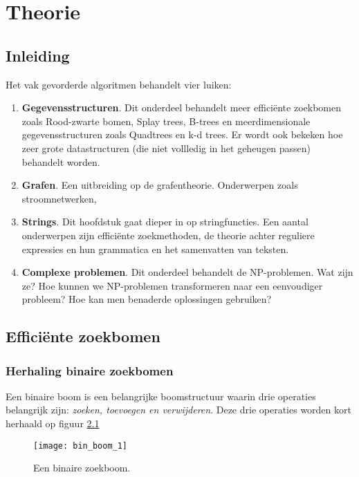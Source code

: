 \documentclass{report}
\begin{document}
	\tableofcontents
	\part{Theorie}
	\chapter{Inleiding}
	Het vak gevorderde algoritmen behandelt vier luiken:
	\begin{enumerate}
		\item \textbf{Gegevensstructuren}. Dit onderdeel behandelt meer efficiënte zoekbomen zoals Rood-zwarte bomen, Splay trees, B-trees en meerdimensionale gegevensstructuren zoals Quadtrees en k-d trees. Er wordt ook bekeken hoe zeer grote datastructuren (die niet vollledig in het geheugen passen) behandelt worden.
		
		\item \textbf{Grafen}. Een uitbreiding op de grafentheorie. Onderwerpen zoals stroomnetwerken, 
		
		\item \textbf{Strings}. Dit hoofdstuk gaat dieper in op stringfuncties. Een aantal onderwerpen zijn efficiënte zoekmethoden, de theorie achter reguliere expressies en hun grammatica en het samenvatten van teksten.
		
		\item \textbf{Complexe problemen}. Dit onderdeel behandelt de NP-problemen. Wat zijn ze? Hoe kunnen we NP-problemen transformeren naar een eenvoudiger probleem? Hoe kan men benaderde oplossingen gebruiken?  
	\end{enumerate}
	\chapter{Efficiënte zoekbomen}
	\section{Herhaling binaire zoekbomen}
	Een binaire boom is een belangrijke boomstructuur waarin drie operaties belangrijk zijn: \textit{zoeken, toevoegen en verwijderen}. Deze drie operaties worden kort herhaald op figuur \ref{fig:bin_boom_1}
	
	\begin{figure}[h]
		\centering
		\texttt{[image: bin\_boom\_1]}
		\caption{Een binaire zoekboom.}
		\label{fig:bin_boom_1}
	\end{figure}
\end{document}
